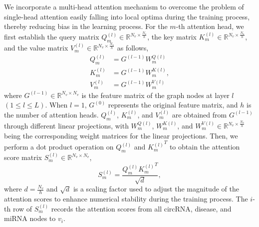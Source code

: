 \documentclass{bioinfo}
\begin{document}
\begin{methods}
We incorporate a multi-head attention mechanism to overcome the problem of single-head attention easily falling into local optima during the training process, thereby reducing bias in the learning process. For the $m$-th attention head, we first establish the query matrix $Q_{m}^{(l)} \in \mathbb{R}^{N_v \times \frac{N_v}{h}}$, the key matrix $K_{m}^{(l)} \in \mathbb{R}^{N_v \times \frac{N_v}{h}}$, and the value matrix $V_{m}^{(l)} \in \mathbb{R}^{N_v \times \frac{N_v}{h}}$ as follows,
\begin{equation}
	\begin{aligned}
		{Q_{m}^{(l)}} &= G^{{(l - 1)}}{W_{m}^{Q{(l)}}} \\
		{K_{m}^{(l)}} &= G^{{(l - 1)}}{W_{m}^{K{(l)}}} ,\\
		{V_{m}^{(l)}} &= G^{(l - 1)}{W_{m}^{V{(l)}}}
	\end{aligned}
\end{equation}
where $G^{(l - 1)} \in \mathbb{R}^{N_v \times N_v}$ is the feature matrix of the graph nodes at layer $l$ $(1 \leqslant l \leqslant L)$. When $l = 1$, $G^{(0)}$ represents the original feature matrix, and $h$ is the number of attention heads. $Q_{m}^{(l)}$, $K_{m}^{(l)}$, and $V_{m}^{(l)}$ are obtained from $G^{(l - 1)}$ through different linear projections, with $W_{m}^{Q{(l)}}$, $W_{m}^{K{(l)}}$, and $W_{m}^{V(l)} \in \mathbb{R}^{N_v \times \frac{N_v}{h}}$ being the corresponding weight matrices for the linear projections. Then, we perform a dot product operation on $Q_{m}^{(l)}$ and ${K_{m}^{(l)}}^T$ to obtain the attention score matrix ${S_{m}^{(l)}} \in \mathbb{R}^{N_v \times N_v}$,
\begin{equation}
	{S_{m}^{(l)}} = \frac{Q_{m}^{(l)}{K_{m}^{(l)}}^T}{\sqrt{d}},
\end{equation}
where $d = \frac{N_v}{h}$ and $\sqrt{d}$ is a scaling factor used to adjust the magnitude of the attention scores to enhance numerical stability during the training process. The $i$-th row of $S_{m}^{(l)}$ records the attention scores from all circRNA, disease, and miRNA nodes to $v_i$.


\end{methods}
\end{document}
